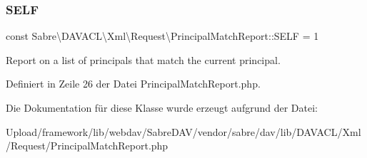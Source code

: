 \subsubsection{\texorpdfstring{S\+E\+LF}{SELF}}
{\footnotesize\ttfamily const Sabre\textbackslash{}\+D\+A\+V\+A\+C\+L\textbackslash{}\+Xml\textbackslash{}\+Request\textbackslash{}\+Principal\+Match\+Report\+::\+S\+E\+LF = 1}

Report on a list of principals that match the current principal. 

Definiert in Zeile 26 der Datei Principal\+Match\+Report.\+php.



Die Dokumentation für diese Klasse wurde erzeugt aufgrund der Datei\+:\begin{DoxyCompactItemize}
\item 
Upload/framework/lib/webdav/\+Sabre\+D\+A\+V/vendor/sabre/dav/lib/\+D\+A\+V\+A\+C\+L/\+Xml/\+Request/Principal\+Match\+Report.\+php\end{DoxyCompactItemize}
